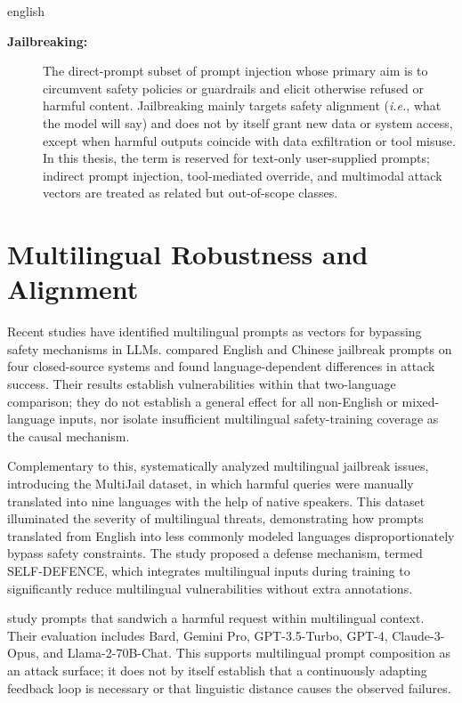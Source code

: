 \begin{otherlanguage*}{english}
\begin{description}
  \item[\textbf{Jailbreaking:}] The direct-prompt subset of prompt injection whose primary aim is to circumvent safety policies or guardrails and elicit otherwise refused or harmful content. Jailbreaking mainly targets safety alignment (\textit{i.e.}, what the model will say) and does not by itself grant new data or system access, except when harmful outputs coincide with data exfiltration or tool misuse. In this thesis, the term is reserved for text-only user-supplied prompts; indirect prompt injection, tool-mediated override, and multimodal attack vectors are treated as related but out-of-scope classes.
  
\end{description}

	\section{Multilingual Robustness and Alignment}
    
Recent studies have identified multilingual prompts as vectors for bypassing safety mechanisms in LLMs. \textcite{huangTowerBabelRevisited2025} compared English and Chinese jailbreak prompts on four closed-source systems and found language-dependent differences in attack success. Their results establish vulnerabilities within that two-language comparison; they do not establish a general effect for all non-English or mixed-language inputs, nor isolate insufficient multilingual safety-training coverage as the causal mechanism.

Complementary to this, \textcite{dengMultilingualJailbreakChallenges2024} systematically analyzed multilingual jailbreak issues, introducing the MultiJail dataset, in which harmful queries were manually translated into nine languages with the help of native speakers. This dataset illuminated the severity of multilingual threats, demonstrating how prompts translated from English into less commonly modeled languages disproportionately bypass safety constraints. The study proposed a defense mechanism, termed SELF-DEFENCE, which integrates multilingual inputs during training to significantly reduce multilingual vulnerabilities without extra annotations.

\textcite{upadhayaySandwichAttackMultilanguage2024} study prompts that sandwich a harmful request within multilingual context. Their evaluation includes Bard, Gemini Pro, GPT-3.5-Turbo, GPT-4, Claude-3-Opus, and Llama-2-70B-Chat. This supports multilingual prompt composition as an attack surface; it does not by itself establish that a continuously adapting feedback loop is necessary or that linguistic distance causes the observed failures.


\end{otherlanguage*}
